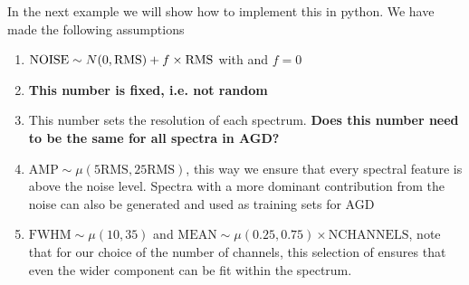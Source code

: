\documentclass[letterpaper,10pt,openany,oneside]{sphinxmanual}
\begin{document}
In the next example we will show how to implement this in python. We
have made the following assumptions
\begin{enumerate}
\item {} 
\(\mathrm{NOISE} \sim N(0, {\rm RMS}) + f \times {\rm RMS}\)
with  and \(f=0\)

\item {} 
 \textbf{This number is fixed, i.e. not random}

\item {} 
 This number sets the resolution of each
spectrum. \textbf{Does this number need to be the same for all spectra in
AGD?}

\item {} 
\(\mathrm{AMP} \sim \mu(5 \mathrm{RMS}, 25 \mathrm{RMS})\),
this way we ensure that every spectral feature is above the noise
level. Spectra with a more dominant contribution from the noise can
also be generated and used as training sets for AGD

\item {} 
\(\mathrm{FWHM} \sim \mu(10, 35)\) and \(\mathrm{MEAN}
\sim \mu(0.25, 0.75) \times \mathrm{NCHANNELS}\), note that for our
choice of the number of channels, this selection of 
ensures that even the wider component can be fit within the
spectrum.

\end{enumerate}
\end{document}
